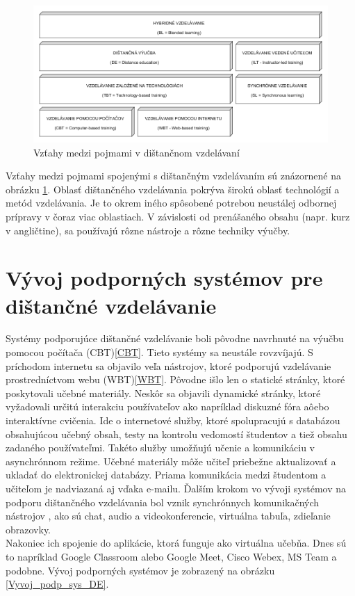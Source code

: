 \documentclass[10pt,oneside,slovak,a4paper]{article}
\begin{document}
\begin{figure}[h]
	\centering
	\includegraphics[width=\textwidth]{Vztahy_DE.png}
	\caption{Vzťahy medzi pojmami v dištančnom vzdelávaní\cite{WiktorzakKotowski}}
	\label{Vztahy_medzi_pojmami}
\end{figure}

Vzťahy medzi pojmami spojenými s dištančným vzdelávaním sú znázornené na obrázku \ref{Vztahy_medzi_pojmami}.
Oblasť dištančného vzdelávania pokrýva širokú oblasť technológií a metód vzdelávania. 
Je to okrem iného spôsobené potrebou neustálej odbornej prípravy v čoraz viac oblastiach.
V závislosti od prenášaného obsahu (napr. kurz v angličtine), sa používajú rôzne nástroje a rôzne techniky výučby.\cite{WiktorzakKotowski}

\section{Vývoj podporných systémov pre dištančné vzdelávanie}%
\label{Vyvojsys}
Systémy podporujúce dištančné vzdelávanie boli pôvodne navrhnuté na výučbu pomocou počítača (CBT)\ref{CBT}. Tieto systémy sa neustále rovzvíjajú.
S príchodom internetu sa objavilo veľa nástrojov, ktoré podporujú vzdelávanie prostredníctvom webu (WBT)\ref{WBT}.
Pôvodne išlo len o statické stránky, ktoré poskytovali učebné materiály. Neskôr sa objavili dynamické stránky, ktoré vyžadovali určitú interakciu používateľov ako napríklad diskuzné fóra aôebo interaktívne cvičenia.
Ide o internetové služby, ktoré spolupracujú s databázou obsahujúcou učebný obsah, testy na kontrolu vedomostí študentov a tiež obsahu zadaného používateľmi.
Takéto služby umožňujú učenie a komunikáciu v asynchrónnom režime. %
Učebné materiály môže učiteľ priebežne aktualizovať a ukladať do elektronickej databázy.
Priama komunikácia medzi študentom a učiteľom je nadviazaná aj vďaka e-mailu.
Ďalším krokom vo vývoji systémov na podporu dištančného vzdelávania bol vznik synchrónnych komunikačných nástrojov
, ako sú chat, audio a videokonferencie, virtuálna tabuľa, zdieľanie obrazovky. \\Nakoniec ich spojenie do aplikácie, ktorá funguje ako virtuálna učebňa.\cite{WiktorzakKotowski} 
Dnes sú to napríklad Google Classroom alebo Google Meet, Cisco Webex, MS Team a podobne.
Vývoj podporných systémov je zobrazený na obrázku \ref{Vyvoj_podp_sys_DE}.
\end{document}
